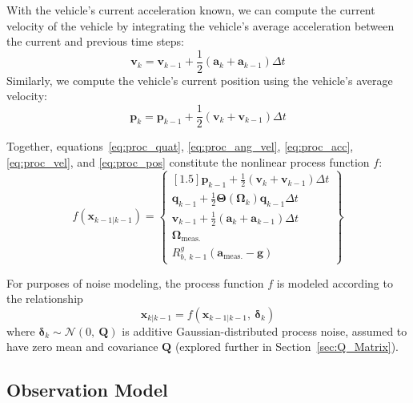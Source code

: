 With the vehicle's current acceleration known, we can compute the current velocity of the vehicle by integrating the vehicle's average acceleration between the current and previous time steps:
%
\begin{equation} \label{eq:proc_vel}
\mathbf{v}_{k} = \mathbf{v}_{k-1} + \frac{1}{2} \left( \mathbf{a}_{k} + \mathbf{a}_{k-1} \right) \Delta t
\end{equation}
%
Similarly, we compute the vehicle's current position using the vehicle's average velocity:
%
\begin{equation} \label{eq:proc_pos}
\mathbf{p}_{k} = \mathbf{p}_{k-1} + \frac{1}{2} \left( \mathbf{v}_{k} + \mathbf{v}_{k-1} \right) \Delta t
\end{equation}

Together, equations~\ref{eq:proc_quat}, \ref{eq:proc_ang_vel}, \ref{eq:proc_acc}, \ref{eq:proc_vel}, and \ref{eq:proc_pos} constitute the nonlinear process function $f$:
%
\begin{equation}
f \left( \mathbf{x}_{k-1 | k-1} \right) = 
\begin{Bmatrix}[1.5]
   \mathbf{p}_{k-1} + \frac{1}{2} \left( \mathbf{v}_{k} + \mathbf{v}_{k-1} \right) \Delta t \\
   \mathbf{q}_{k-1} + \frac{1}{2} \mathbf{\Theta} \left( \bm{\Omega}_{k} \right) \mathbf{q}_{k-1} \Delta t \\
   \mathbf{v}_{k-1} + \frac{1}{2} \left( \mathbf{a}_{k} + \mathbf{a}_{k-1} \right) \Delta t \\
   \bm{\Omega}_{\text{meas.}} \\
   R^{g}_{b,\ k-1} \left( \mathbf{a}_{\text{meas.}} - \mathbf{g} \right)
\end{Bmatrix}
\end{equation}

For purposes of noise modeling, the process function $f$ is modeled according to the relationship
%
\begin{equation}
\mathbf{x}_{k | k-1} = f \left( \mathbf{x}_{k-1 | k-1},\ \bm{\delta}_{k} \right)
\end{equation}
%
where $\bm{\delta}_{k} \sim \mathcal{N} \left( 0,\ \mathbf{Q} \right)$ is additive Gaussian-distributed process noise, assumed to have zero mean and covariance $\mathbf{Q}$ (explored further in Section~\ref{sec:Q_Matrix}).


\subsection{Observation Model} \label{Observation_Model}

